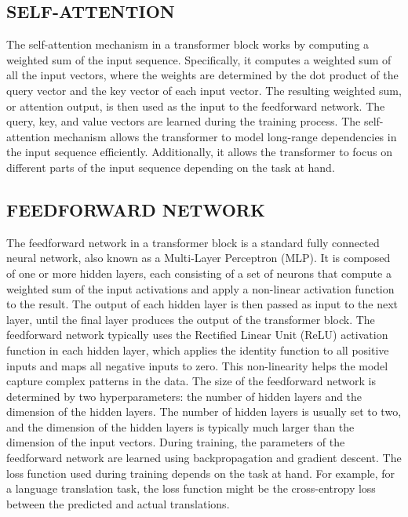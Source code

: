 \documentclass[letterpaper, 10 pt, conference]{ieeeconf}  %
\begin{document}
\subsection{SELF-ATTENTION} 

The self-attention mechanism in a transformer block works by computing a weighted sum of the input sequence. Specifically, it
computes a weighted sum of all the input vectors, where the weights are determined by the dot product of the query vector and the
key vector of each input vector.
The resulting weighted sum, or attention output, is then used as the input to the feedforward network. The query, key,
and value vectors are learned during the training process.
The self-attention mechanism allows the transformer to model long-range dependencies in the input sequence efficiently.
Additionally, it allows the transformer to focus on different parts of the input sequence depending on the task at hand.

\subsection{FEEDFORWARD NETWORK}

The feedforward network in a transformer block is a standard fully connected neural network, also known as a Multi-Layer
Perceptron (MLP). It is composed of one or more hidden layers, each consisting of a set of neurons that compute a weighted sum
of the input activations and apply a non-linear activation function to the result. The output of each hidden layer is then passed as
input to the next layer, until the final layer produces the output of the transformer block.
The feedforward network typically uses the Rectified Linear Unit (ReLU) activation function in each hidden layer, which
applies the identity function to all positive inputs and maps all negative inputs to zero. This non-linearity helps the model capture
complex patterns in the data.
The size of the feedforward network is determined by two hyperparameters: the number of hidden layers and the
dimension of the hidden layers. The number of hidden layers is usually set to two, and the dimension of the hidden layers is typically
much larger than the dimension of the input vectors.
During training, the parameters of the feedforward network are learned using backpropagation and gradient descent. The
loss function used during training depends on the task at hand. For example, for a language translation task, the loss function might
be the cross-entropy loss between the predicted and actual translations.
\end{document}

